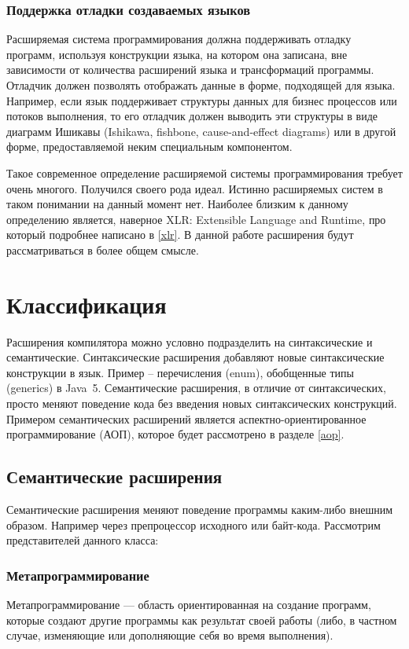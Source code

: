 \documentclass[a4paper,12pt,titlepage]{extarticle}
\begin{document}
\subsubsection*{Поддержка отладки создаваемых языков}
Расширяемая система программирования должна поддерживать отладку программ,
используя конструкции языка, на котором она записана, вне зависимости от
количества расширений языка и трансформаций программы. Отладчик должен
позволять отображать данные в форме, подходящей для языка. Например, если язык
поддерживает структуры данных для бизнес процессов или потоков выполнения, то
его отладчик должен выводить эти структуры в виде диаграмм Ишикавы
\cite{ishikawa} (Ishikawa, fishbone, cause-and-effect diagrams) или в другой
форме, предоставляемой неким специальным компонентом.

Такое современное определение расширяемой системы программирования требует
очень многого. Получился своего рода идеал. Истинно расширяемых систем в таком
понимании на данный момент нет. Наиболее близким к данному определению
является, наверное XLR: Extensible Language and Runtime, про который подробнее
написано в \ref{xlr}. В данной работе расширения будут рассматриваться в более
общем смысле.

\section{Классификация}
\label{clas}

Расширения компилятора можно условно подразделить на синтаксические и
семантические. Синтаксические расширения добавляют новые синтаксические
конструкции в язык. Пример -- перечисления (enum), обобщенные типы (generics) в
Java~5. Семантические расширения, в отличие от синтаксических, просто меняют
поведение кода без введения новых синтаксических конструкций. Примером
семантических расширений является аспектно-ориентированное программирование
(АОП), которое будет рассмотрено в разделе \ref{aop}.

\subsection{Семантические расширения}

Семантические расширения меняют поведение программы каким-либо внешним образом.
Например через препроцессор исходного или байт-кода.
Рассмотрим представителей данного класса:

\subsubsection*{Метапрограммирование}
Метапрограммирование — область ориентированная на создание программ, которые
создают другие программы как результат своей работы (либо, в частном случае,
изменяющие или дополняющие себя во время выполнения).
\end{document}
